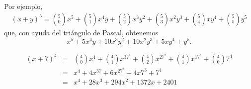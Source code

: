 \medskip

\begin{ejemplo}
  Por ejemplo,
  \begin{align*}
    (x+y)^5 = \binom{5}{0}x^5 + \binom{5}{1}x^4y + \binom{5}{2}x^3y^2 + \binom{5}{3}x^2y^3 + \binom{5}{4} xy^4 + \binom{5}{5}y^5
  \end{align*}
  que, con ayuda del tri\'angulo de Pascal, obtenemos 
  \[
  x^5 + 5x^4y + 10x^3y^2 + 10x^2y^3 + 5xy^4 + y^5.
  \]
\end{ejemplo}

\begin{ejemplo}
  \begin{eqnarray*}
    (x+7)^4&=&\binom{4}{0}x^4 + \binom{4}{1}x^37^1 + \binom{4}{2}x^27^2 + \binom{4}{1}x^17^3 + \binom{4}{0}7^4\\
    &=& x^4+4x^37+6x^27^2+4x7^3+ 7^4\\
    &=& x^4+28x^3+294x^2+1372x+ 2401
  \end{eqnarray*}
\end{ejemplo}

